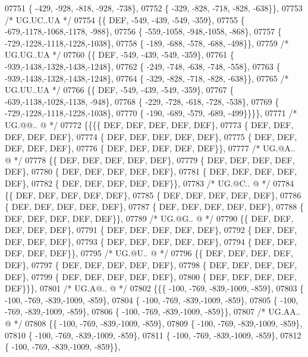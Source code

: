 \begin{DoxyCode}
07751 \{ -429, -928, -818, -928, -738\},
07752 \{ -329, -828, -718, -828, -638\}\},
07753 \textcolor{comment}{/* UG.UC..UA */}
07754 \{\{  DEF, -549, -439, -549, -359\},
07755 \{ -679,-1178,-1068,-1178, -988\},
07756 \{ -559,-1058, -948,-1058, -868\},
07757 \{ -729,-1228,-1118,-1228,-1038\},
07758 \{ -189, -688, -578, -688, -498\}\},
07759 \textcolor{comment}{/* UG.UG..UA */}
07760 \{\{  DEF, -549, -439, -549, -359\},
07761 \{ -939,-1438,-1328,-1438,-1248\},
07762 \{ -249, -748, -638, -748, -558\},
07763 \{ -939,-1438,-1328,-1438,-1248\},
07764 \{ -329, -828, -718, -828, -638\}\},
07765 \textcolor{comment}{/* UG.UU..UA */}
07766 \{\{  DEF, -549, -439, -549, -359\},
07767 \{ -639,-1138,-1028,-1138, -948\},
07768 \{ -229, -728, -618, -728, -538\},
07769 \{ -729,-1228,-1118,-1228,-1038\},
07770 \{ -190, -689, -579, -689, -499\}\}\}\},
07771 \textcolor{comment}{/* UG.@@.. @ */}
07772 \{\{\{\{  DEF,  DEF,  DEF,  DEF,  DEF\},
07773 \{  DEF,  DEF,  DEF,  DEF,  DEF\},
07774 \{  DEF,  DEF,  DEF,  DEF,  DEF\},
07775 \{  DEF,  DEF,  DEF,  DEF,  DEF\},
07776 \{  DEF,  DEF,  DEF,  DEF,  DEF\}\},
07777 \textcolor{comment}{/* UG.@A.. @ */}
07778 \{\{  DEF,  DEF,  DEF,  DEF,  DEF\},
07779 \{  DEF,  DEF,  DEF,  DEF,  DEF\},
07780 \{  DEF,  DEF,  DEF,  DEF,  DEF\},
07781 \{  DEF,  DEF,  DEF,  DEF,  DEF\},
07782 \{  DEF,  DEF,  DEF,  DEF,  DEF\}\},
07783 \textcolor{comment}{/* UG.@C.. @ */}
07784 \{\{  DEF,  DEF,  DEF,  DEF,  DEF\},
07785 \{  DEF,  DEF,  DEF,  DEF,  DEF\},
07786 \{  DEF,  DEF,  DEF,  DEF,  DEF\},
07787 \{  DEF,  DEF,  DEF,  DEF,  DEF\},
07788 \{  DEF,  DEF,  DEF,  DEF,  DEF\}\},
07789 \textcolor{comment}{/* UG.@G.. @ */}
07790 \{\{  DEF,  DEF,  DEF,  DEF,  DEF\},
07791 \{  DEF,  DEF,  DEF,  DEF,  DEF\},
07792 \{  DEF,  DEF,  DEF,  DEF,  DEF\},
07793 \{  DEF,  DEF,  DEF,  DEF,  DEF\},
07794 \{  DEF,  DEF,  DEF,  DEF,  DEF\}\},
07795 \textcolor{comment}{/* UG.@U.. @ */}
07796 \{\{  DEF,  DEF,  DEF,  DEF,  DEF\},
07797 \{  DEF,  DEF,  DEF,  DEF,  DEF\},
07798 \{  DEF,  DEF,  DEF,  DEF,  DEF\},
07799 \{  DEF,  DEF,  DEF,  DEF,  DEF\},
07800 \{  DEF,  DEF,  DEF,  DEF,  DEF\}\}\},
07801 \textcolor{comment}{/* UG.A@.. @ */}
07802 \{\{\{ -100, -769, -839,-1009, -859\},
07803 \{ -100, -769, -839,-1009, -859\},
07804 \{ -100, -769, -839,-1009, -859\},
07805 \{ -100, -769, -839,-1009, -859\},
07806 \{ -100, -769, -839,-1009, -859\}\},
07807 \textcolor{comment}{/* UG.AA.. @ */}
07808 \{\{ -100, -769, -839,-1009, -859\},
07809 \{ -100, -769, -839,-1009, -859\},
07810 \{ -100, -769, -839,-1009, -859\},
07811 \{ -100, -769, -839,-1009, -859\},
07812 \{ -100, -769, -839,-1009, -859\}\},

\end{DoxyCode}
